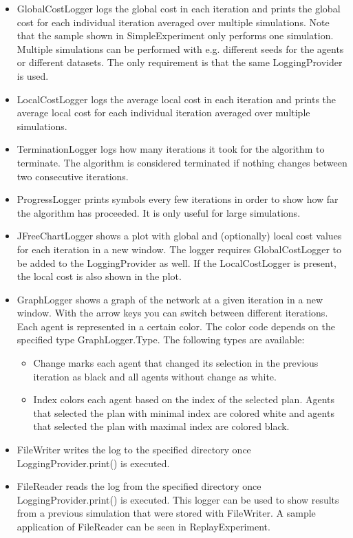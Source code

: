 \documentclass[11pt]{article} %
\newcommand{\code}{}
\begin{document}
\begin{itemize}
	\item \code{GlobalCostLogger} logs the global cost in each iteration and prints the global cost for each individual iteration averaged over multiple simulations. Note that the sample shown in \code{SimpleExperiment} only performs one simulation. Multiple simulations can be performed with e.g. different seeds for the agents or different datasets. The only requirement is that the same \code{LoggingProvider} is used.
	\item \code{LocalCostLogger} logs the average local cost in each iteration and prints the average local cost for each individual iteration averaged over multiple simulations.
	\item \code{TerminationLogger} logs how many iterations it took for the algorithm to terminate. The algorithm is considered terminated if nothing changes between two consecutive iterations.
	\item \code{ProgressLogger} prints symbols every few iterations in order to show how far the algorithm has proceeded. It is only useful for large simulations.
	\item \code{JFreeChartLogger} shows a plot with global and (optionally) local cost values for each iteration in a new window. The logger requires \code{GlobalCostLogger} to be added to the \code{LoggingProvider} as well. If the \code{LocalCostLogger} is present, the local cost is also shown in the plot.
	\item \code{GraphLogger} shows a graph of the network at a given iteration in a new window. With the arrow keys you can switch between different iterations. Each agent is represented in a certain color. The color code depends on the specified type \code{GraphLogger.Type}. The following types are available:
	\begin{itemize}
		\item \code{Change} marks each agent that changed its selection in the previous iteration as black and all agents without change as white.
		\item \code{Index} colors each agent based on the index of the selected plan. Agents that selected the plan with minimal index are colored white and agents that selected the plan with maximal index are colored black.
	\end{itemize}
	\item \code{FileWriter} writes the log to the specified directory once \code{LoggingProvider.print()} is executed.
	\item \code{FileReader} reads the log from the specified directory once \code{LoggingProvider.print()} is executed. This logger can be used to show results from a previous simulation that were stored with \code{FileWriter}. A sample application of \code{FileReader} can be seen in \code{ReplayExperiment}.
\end{itemize}
\end{document}
